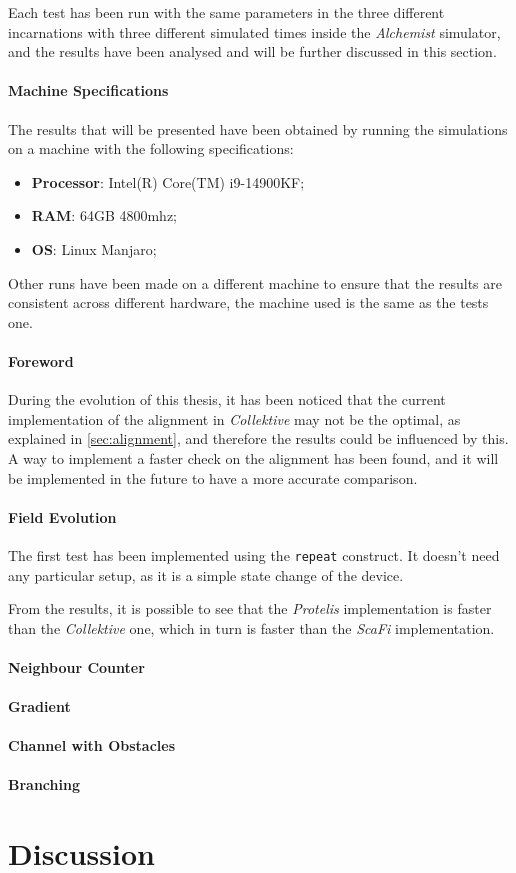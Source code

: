 Each test has been run with the same parameters in the three different incarnations with three different simulated times
inside the \emph{Alchemist} simulator, and the results have been analysed and will be further discussed in this section.

\paragraph{Machine Specifications}
The results that will be presented have been obtained by running the simulations on a machine with the following specifications:
\begin{itemize}
    \item \textbf{Processor}: Intel(R) Core(TM) i9-14900KF;
    \item \textbf{RAM}: 64GB 4800mhz;
    \item \textbf{OS}: Linux Manjaro;
\end{itemize}

Other runs have been made on a different machine to ensure that the results are consistent across different hardware,
the machine used is the same as the tests one.

\paragraph{Foreword}
During the evolution of this thesis, it has been noticed that the current implementation of the alignment in \emph{Collektive}
may not be the optimal, as explained in \ref{sec:alignment}, and therefore the results could be influenced by this.
A way to implement a faster check on the alignment has been found, and it will be implemented in the future to have a more accurate comparison.

\paragraph{Field Evolution}
The first test has been implemented using the \texttt{repeat} construct.
It doesn't need any particular setup, as it is a simple state change of the device.

From the results, it is possible to see that the \emph{Protelis} implementation is faster than the \emph{Collektive} one,
which in turn is faster than the \emph{ScaFi} implementation.

\paragraph{Neighbour Counter}

\paragraph{Gradient}

\paragraph{Channel with Obstacles}

\paragraph{Branching}

\section{Discussion}

